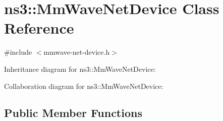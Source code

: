 \hypertarget{classns3_1_1MmWaveNetDevice}{}\section{ns3\+:\+:Mm\+Wave\+Net\+Device Class Reference}
\label{classns3_1_1MmWaveNetDevice}


{\ttfamily \#include $<$mmwave-\/net-\/device.\+h$>$}



Inheritance diagram for ns3\+:\+:Mm\+Wave\+Net\+Device\+:


Collaboration diagram for ns3\+:\+:Mm\+Wave\+Net\+Device\+:
\subsection*{Public Member Functions}
